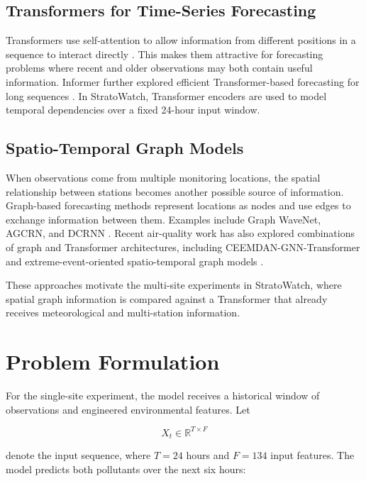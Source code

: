 \documentclass[conference]{IEEEtran}
\begin{document}
\subsection{Transformers for Time-Series Forecasting}

Transformers use self-attention to allow information from different positions in a sequence to
interact directly \cite{vaswani}. This makes them attractive for forecasting problems where
recent and older observations may both contain useful information. Informer further explored
efficient Transformer-based forecasting for long sequences \cite{informer}. In StratoWatch,
Transformer encoders are used to model temporal dependencies over a fixed 24-hour input
window.

\subsection{Spatio-Temporal Graph Models}

When observations come from multiple monitoring locations, the spatial relationship between
stations becomes another possible source of information. Graph-based forecasting methods
represent locations as nodes and use edges to exchange information between them. Examples
include Graph WaveNet, AGCRN, and DCRNN \cite{graphwavenet,agcrn,dcrnn}. Recent air-quality
work has also explored combinations of graph and Transformer architectures, including
CEEMDAN-GNN-Transformer and extreme-event-oriented spatio-temporal graph models
\cite{ceemdan2025,estgcn2025}.

These approaches motivate the multi-site experiments in StratoWatch, where spatial graph
information is compared against a Transformer that already receives meteorological and
multi-station information.

\section{Problem Formulation}

For the single-site experiment, the model receives a historical window of observations and
engineered environmental features. Let

\begin{equation}
X_t \in \mathbb{R}^{T \times F}
\end{equation}

denote the input sequence, where $T=24$ hours and $F=134$ input features. The model predicts
both pollutants over the next six hours:
\end{document}
